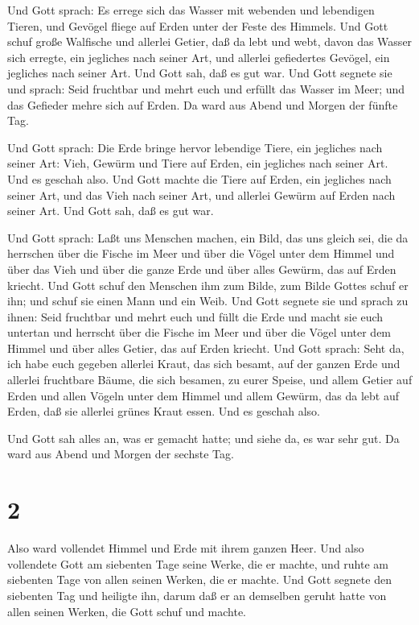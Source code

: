  Und Gott sprach: Es errege sich das Wasser mit webenden
und lebendigen Tieren, und Gevögel fliege auf Erden unter der Feste des
Himmels.  Und Gott schuf große Walfische und allerlei
Getier, daß da lebt und webt, davon das Wasser sich erregte, ein
jegliches nach seiner Art, und allerlei gefiedertes Gevögel, ein
jegliches nach seiner Art. Und Gott sah, daß es gut war. 
Und Gott segnete sie und sprach: Seid fruchtbar und mehrt euch und
erfüllt das Wasser im Meer; und das Gefieder mehre sich auf Erden.
 Da ward aus Abend und Morgen der fünfte Tag.

 Und Gott sprach: Die Erde bringe hervor lebendige Tiere,
ein jegliches nach seiner Art: Vieh, Gewürm und Tiere auf Erden, ein
jegliches nach seiner Art. Und es geschah also.  Und Gott
machte die Tiere auf Erden, ein jegliches nach seiner Art, und das Vieh
nach seiner Art, und allerlei Gewürm auf Erden nach seiner Art. Und Gott
sah, daß es gut war.

 Und Gott sprach: Laßt uns Menschen machen, ein Bild, das
uns gleich sei, die da herrschen über die Fische im Meer und über die
Vögel unter dem Himmel und über das Vieh und über die ganze Erde und
über alles Gewürm, das auf Erden kriecht.  Und Gott schuf
den Menschen ihm zum Bilde, zum Bilde Gottes schuf er ihn; und schuf sie
einen Mann und ein Weib.  Und Gott segnete sie und sprach
zu ihnen: Seid fruchtbar und mehrt euch und füllt die Erde und macht sie
euch untertan und herrscht über die Fische im Meer und über die Vögel
unter dem Himmel und über alles Getier, das auf Erden kriecht.
 Und Gott sprach: Seht da, ich habe euch gegeben allerlei
Kraut, das sich besamt, auf der ganzen Erde und allerlei fruchtbare
Bäume, die sich besamen, zu eurer Speise,  und allem Getier
auf Erden und allen Vögeln unter dem Himmel und allem Gewürm, das da
lebt auf Erden, daß sie allerlei grünes Kraut essen. Und es geschah
also.

 Und Gott sah alles an, was er gemacht hatte; und siehe da,
es war sehr gut. Da ward aus Abend und Morgen der sechste Tag.

\hypertarget{section-1}{%
\section{2}\label{section-1}}

 Also ward vollendet Himmel und Erde mit ihrem ganzen Heer.
 Und also vollendete Gott am siebenten Tage seine Werke, die
er machte, und ruhte am siebenten Tage von allen seinen Werken, die er
machte.  Und Gott segnete den siebenten Tag und heiligte
ihn, darum daß er an demselben geruht hatte von allen seinen Werken, die
Gott schuf und machte.

